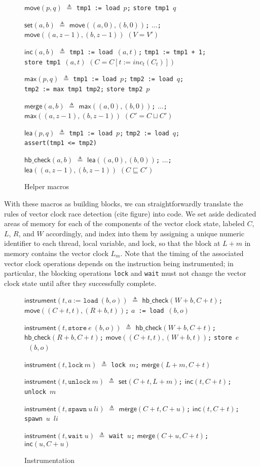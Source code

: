 \documentclass[preprint, 10pt]{sigplanconf}
\newcommand{\assign}[2]{#1\ \texttt{:=}\ #2}
\newcommand{\load}[2]{#1\ \texttt{:= load}\ #2}
\newcommand{\store}[2]{\texttt{store}\ #2\ #1}
\newcommand{\lock}[1]{\texttt{lock}\ #1}
\newcommand{\unlock}[1]{\texttt{unlock}\ #1}
\newcommand{\spawn}[2]{\texttt{spawn}\ #1\ #2}
\newcommand{\wait}[1]{\texttt{wait}\ #1}
\newcommand{\assert}[2]{\texttt{assert(}#1\ \texttt{<=}\ #2\texttt{)}}
\newcommand{\move}[2]{\ensuremath{\mathsf{move}(#1, #2)}}
\newcommand{\setvc}[2]{\ensuremath{\mathsf{set}(#1, #2)}}
\newcommand{\incvc}[2]{\ensuremath{\mathsf{inc}(#1, #2)}}
\newcommand{\maxa}[2]{\ensuremath{\mathsf{max}(#1, #2)}}
\newcommand{\maxvc}[2]{\ensuremath{\mathsf{merge}(#1, #2)}}
\newcommand{\lea}[2]{\ensuremath{\mathsf{lea}(#1, #2)}}
\newcommand{\vcle}[2]{\ensuremath{\mathsf{hb\_check}(#1, #2)}}
\newcommand{\instr}[2]{\ensuremath{\mathsf{instrument}(#1, #2)}}
\begin{document}
\begin{figure}[htb]
\move{p}{q} $\triangleq$ \load{\texttt{tmp1}}{$p$}\texttt{;} \store{$q$}{\texttt{tmp1}}

\setvc{a}{b} $\triangleq$ \move{(a, 0)}{(b, 0)}\texttt{;} ...\texttt{;} \move{(a, z - 1)}{(b, z - 1)}
$(V = V')$

\incvc{a}{b} $\triangleq$ \load{\texttt{tmp1}}{$(a, t)$}\texttt{;} \assign{\texttt{tmp1}}{\texttt{tmp1 + 1}}\texttt{;} \store{$(a, t)$}{\texttt{tmp1}}
$(C = C[t := \mathit{inc}_t(C_t)])$

\maxa{p}{q} $\triangleq$ \load{\texttt{tmp1}}{$p$}\texttt{;} \load{\texttt{tmp2}}{$q$}\texttt{;} \assign{\texttt{tmp2}}{\texttt{max\ tmp1\ tmp2}}\texttt{;} \store{$p$}{\texttt{tmp2}}

\maxvc{a}{b} $\triangleq$ \maxa{(a, 0)}{(b, 0)}\texttt{;} ...\texttt{;} \maxa{(a, z - 1)}{(b, z - 1)}
$(C' = C \sqcup C')$

\lea{p}{q} $\triangleq$ \load{\texttt{tmp1}}{$p$}\texttt{;} \load{\texttt{tmp2}}{$q$}\texttt{;} \assert{\texttt{tmp1}}{\texttt{tmp2}}

\vcle{a}{b} $\triangleq$ \lea{(a, 0)}{(b, 0)}\texttt{;} ...\texttt{;} \lea{(a, z - 1)}{(b, z - 1)}
$(C \sqsubseteq C')$
\caption{Helper macros}
\label{helper}
\end{figure}

With these macros as building blocks, we can straightforwardly translate the rules of vector clock race detection (cite figure) into code. We set aside dedicated areas of memory for each of the components of the vector clock state, labeled $C$, $L$, $R$, and $W$ accordingly, and index into them by assigning a unique numeric identifier to each thread, local variable, and lock, so that the block at $L + m$ in memory contains the vector clock $L_m$. Note that the timing of the associated vector clock operations depends on the instruction being instrumented; in particular, the blocking operations \texttt{lock} and \texttt{wait} must not change the vector clock state until after they successfully complete.

\begin{figure}[htb]
\instr{t}{\load{a}{(b, o)}} $\triangleq$ \vcle{W + b}{C + t}\texttt{;} \move{(C + t, t)}{(R + b, t)}\texttt{;} \load{$a$}{$(b, o)$}

\instr{t}{\store{(b, o)}{e}} $\triangleq$ \vcle{W + b}{C + t}\texttt{;} \vcle{R + b}{C + t}\texttt{;} \move{(C + t, t)}{(W + b, t)}\texttt{;} \store{$(b, o)$}{$e$}

\instr{t}{\lock{m}} $\triangleq$ \lock{$m$}\texttt{;} \maxvc{L + m}{C + t}

\instr{t}{\unlock{m}} $\triangleq$ \setvc{C + t}{L + m}\texttt{;} \incvc{t}{C + t}\texttt{;} \unlock{$m$}

\instr{t}{\spawn{u}{\mathit{li}}} $\triangleq$ \maxvc{C + t}{C + u}\texttt{;} \incvc{t}{C + t}\texttt{;} \spawn{$u$}{$\mathit{li}$}

\instr{t}{\wait{u}} $\triangleq$ \wait{$u$}\texttt{;} \maxvc{C + u}{C + t}\texttt{;} \incvc{u}{C + u}
\caption{Instrumentation}
\label{instrumentation}
\end{figure}
\end{document}
